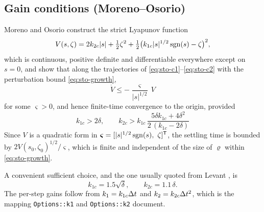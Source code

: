 \subsection{Gain conditions (Moreno--Osorio)}
Moreno and Osorio \cite{moreno2008,moreno2012strict} construct the strict Lyapunov function
\begin{equation}
V(s,\zeta) = 2k_{2c}|s| + \tfrac12\zeta^2 + \tfrac12\big(k_{1c}|s|^{1/2}\operatorname{sgn}(s) - \zeta\big)^2 ,
\label{eq:sto-lyap}
\end{equation}
which is continuous, positive definite and differentiable everywhere except on $s=0$, and show
that along the trajectories of \eqref{eq:sto-c1}--\eqref{eq:sto-c2} with the perturbation bound
\eqref{eq:sto-growth},
\begin{equation}
\dot{V} \le -\frac{\varsigma}{|s|^{1/2}}\,V
\end{equation}
for some $\varsigma>0$, and hence finite-time convergence to the origin, provided
\begin{equation}
\boxed{\ k_{1c} > 2\delta , \qquad
k_{2c} > k_{1c}\,\frac{5\delta k_{1c} + 4\delta^2}{2\,(k_{1c}-2\delta)}\ }
\label{eq:sto-cond}
\end{equation}
Since $V$ is a quadratic form in $\bm{\varsigma}=[|s|^{1/2}\sgn(s),\ \zeta]^\T$, the settling
time is bounded by $2V(s_0,\zeta_0)^{1/2}/\varsigma$, which is finite and independent of the
size of $\varrho$ within \eqref{eq:sto-growth}.

A convenient sufficient choice, and the one usually quoted from Levant \cite{levant1993}, is
\begin{equation}
k_{1c} = 1.5\sqrt{\delta} , \qquad k_{2c} = 1.1\,\delta .
\label{eq:sto-levant}
\end{equation}
The per-step gains follow from $k_1 = k_{1c}\Delta t$ and $k_2 = k_{2c}\Delta t^2$, which is the mapping
\texttt{Options::k1} and \texttt{Options::k2} document.

